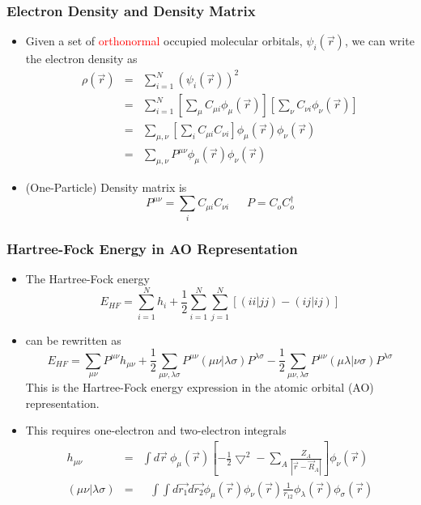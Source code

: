 \documentclass[handout]{beamer} %
\begin{document}
\begin{frame}
\frametitle{Electron Density and Density Matrix} 
\begin{itemize}
\item \footnotesize{Given a set of \textcolor{red}{orthonormal} occupied molecular orbitals, $\psi_i(\vec{r})$, we can write the electron density as }
\begin{eqnarray*}
\rho(\vec{r}) & =  & \sum_{i=1}^N (\psi_i(\vec{r})) ^2  \\
& = & \sum_{i=1}^N  \left[ \sum_{\mu} C_{\mu i} \phi_{\mu}(\vec{r}) \right]   \left[ \sum_{\nu} C_{\nu i} \phi_{\nu}(\vec{r}) \right]  \\
& = & \sum_{\mu, \nu}  \left[ \sum_i   C_{\mu i}  C_{\nu i}\right]    \phi_{\mu}(\vec{r})  \phi_{\nu}(\vec{r})  \\
& = & \sum_{\mu, \nu}  P^{\mu \nu}     \phi_{\mu}(\vec{r})  \phi_{\nu}(\vec{r})  
\end{eqnarray*}
\item (One-Particle) Density matrix is 
\begin{equation*}
 P^{\mu \nu} =  \sum_i   C_{\mu i}  C_{\nu i}      ~~~~~~~ P = C_o C_o ^{\dagger} 
\end{equation*}
\end{itemize}
\end{frame}

\begin{frame}
\frametitle{Hartree-Fock Energy in AO Representation} 
\begin{itemize}
\item \footnotesize{The Hartree-Fock energy}
\begin{equation*}
E_{HF} = \sum_{i=1}^N h_i + \frac{1}{2} \sum_{i=1}^N \sum_{j=1}^{N} \left[ (ii|jj) - (ij|ij) \right]
\end{equation*}
\item can be rewritten as
\begin{equation*}
E_{HF} =  \sum_{\mu \nu}   P^{\mu \nu}  h_{\mu\nu} + \frac{1}{2} \sum_{\mu \nu, \lambda \sigma} P^{\mu \nu}  ( \mu \nu | \lambda \sigma ) P^{\lambda \sigma}   
- \frac{1}{2} \sum_{\mu \nu, \lambda \sigma} P^{\mu \nu}  ( \mu \lambda | \nu \sigma ) P^{\lambda \sigma}  
\end{equation*}
This is the Hartree-Fock energy expression in the atomic orbital (AO) representation. 
\item This requires one-electron and two-electron integrals
\begin{eqnarray*}
h_{\mu \nu} & = &  \int d\vec{r}~ \phi_{\mu} (\vec{r}) \left[ -\frac{1}{2} \bigtriangledown^2 - \sum_A \frac{Z_A}{ \left| \vec{r} - \vec{R}_A \right| } \right] \phi_{\nu} (\vec{r})    \\
( \mu \nu | \lambda \sigma )  & = &  ~~~ \int \int d\vec{r_1}  d\vec{r_2}    \phi_{\mu} (\vec{r})  \phi_{\nu} (\vec{r})  \frac{1}{r_{12}}    \phi_{\lambda} (\vec{r})  \phi_{\sigma} (\vec{r}) 
\end{eqnarray*} 

\end{itemize}
\end{frame}
\end{document}
